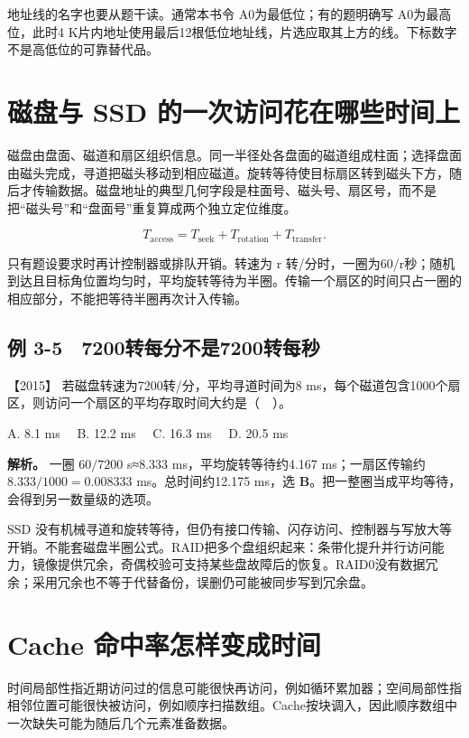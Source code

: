 地址线的名字也要从题干读。通常本书令 A0为最低位；有的题明确写 A0为最高位，此时4 K片内地址使用最后12根低位地址线，片选应取其上方的线。下标数字不是高低位的可靠替代品。

\section{磁盘与 SSD 的一次访问花在哪些时间上}\label{co-03-06}

磁盘由盘面、磁道和扇区组织信息。同一半径处各盘面的磁道组成柱面；选择盘面由磁头完成，寻道把磁头移动到相应磁道。旋转等待使目标扇区转到磁头下方，随后才传输数据。磁盘地址的典型几何字段是柱面号、磁头号、扇区号，而不是把``磁头号''和``盘面号''重复算成两个独立定位维度。

\[
T_{\mathrm{access}}=T_{\mathrm{seek}}+T_{\mathrm{rotation}}+T_{\mathrm{transfer}}.
\]

只有题设要求时再计控制器或排队开销。转速为 r 转/分时，一圈为60/r秒；随机到达且目标角位置均匀时，平均旋转等待为半圈。传输一个扇区的时间只占一圈的相应部分，不能把等待半圈再次计入传输。

\subsection{例 3-5　7200转每分不是7200转每秒}\label{co-ex3-5}

\noindent{}【2015】 若磁盘转速为7200转/分，平均寻道时间为8 ms，每个磁道包含1000个扇区，则访问一个扇区的平均存取时间大约是（　）。

A. 8.1 ms　 B. 12.2 ms　 C. 16.3 ms　 D. 20.5 ms


\textbf{解析。} 一圈 \(60/7200\) s≈8.333 ms，平均旋转等待约4.167 ms；一扇区传输约 \(8.333/1000=0.008333\) ms。总时间约12.175 ms，选 \textbf{B}。把一整圈当成平均等待，会得到另一数量级的选项。

SSD 没有机械寻道和旋转等待，但仍有接口传输、闪存访问、控制器与写放大等开销。不能套磁盘半圈公式。RAID把多个盘组织起来：条带化提升并行访问能力，镜像提供冗余，奇偶校验可支持某些盘故障后的恢复。RAID0没有数据冗余；采用冗余也不等于代替备份，误删仍可能被同步写到冗余盘。

\section{Cache 命中率怎样变成时间}\label{co-03-07}

时间局部性指近期访问过的信息可能很快再访问，例如循环累加器；空间局部性指相邻位置可能很快被访问，例如顺序扫描数组。Cache按块调入，因此顺序数组中一次缺失可能为随后几个元素准备数据。

